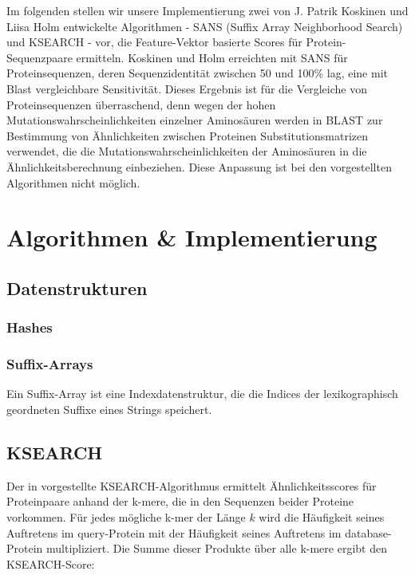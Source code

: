 \documentclass{article}
\begin{document}
Im folgenden stellen wir unsere Implementierung zwei von J. Patrik Koskinen und Liisa Holm entwickelte Algorithmen - SANS (Suffix Array Neighborhood Search) und KSEARCH - vor, die Feature-Vektor basierte Scores für Protein-Sequenzpaare ermitteln. Koskinen und Holm erreichten mit SANS für Proteinsequenzen, deren Sequenzidentität zwischen 50 und 100\% lag, eine mit Blast vergleichbare Sensitivität. Dieses Ergebnis ist für die Vergleiche von Proteinsequenzen überraschend, denn wegen der hohen Mutationswahrscheinlichkeiten einzelner Aminosäuren werden in BLAST zur Bestimmung von Ähnlichkeiten zwischen Proteinen Substitutionsmatrizen verwendet, die die Mutationswahrscheinlichkeiten der Aminosäuren in die Ähnlichkeitsberechnung einbeziehen. Diese Anpassung ist bei den vorgestellten Algorithmen nicht möglich.


\section{Algorithmen \& Implementierung}

\subsection{Datenstrukturen}

\subsubsection{Hashes}%

\subsubsection{Suffix-Arrays}

Ein Suffix-Array ist eine Indexdatenstruktur, die die Indices der lexikographisch geordneten Suffixe eines Strings speichert. %

\subsection{KSEARCH}
\label{ksearch}

Der in \cite{Holm} vorgestellte KSEARCH-Algorithmus ermittelt Ähnlichkeitsscores für Proteinpaare anhand der k-mere, die in den Sequenzen beider Proteine vorkommen. Für jedes mögliche k-mer der Länge $k$ wird die Häufigkeit seines Auftretens im query-Protein mit der Häufigkeit seines Auftretens im database-Protein multipliziert. Die Summe dieser Produkte über alle k-mere ergibt den KSEARCH-Score:
\end{document}
